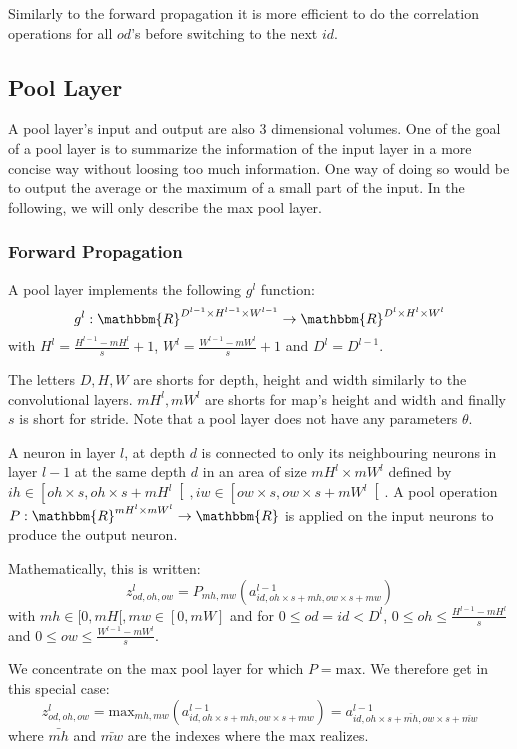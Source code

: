 \documentclass{article} %
\begin{document}
Similarly to the forward propagation it is more efficient to do the correlation operations for all $od$'s before switching to the next $id$.

\subsection{Pool Layer}
A pool layer's input and output are also 3 dimensional volumes. One of the goal of a pool layer is to summarize the information of the input layer in a more concise way without loosing too much information. One way of doing so would be to output the average or the maximum of a small part of the input. In the following, we will only describe the max pool layer.

\subsubsection{Forward Propagation}
A pool layer implements the following $g^l$ function:
$$
g^l : \mathbbm{R}^{D^{l-1}\times H^{l-1} \times W^{l-1}} \rightarrow \mathbbm{R}^{D^l \times H^l \times W^l} 
$$
with $H^{l} = \frac{H^{l-1}-mH^l}{s}+1$, $W^l = \frac{W^{l-1}-mW^l}{s}+1$ and $D^l=D^{l-1}$.

The letters $D, H, W$ are shorts for depth, height and width similarly to the convolutional layers. $mH^l, mW^l$ are shorts for map's height and width and finally $s$ is short for stride. Note that a pool layer does not have any parameters $\theta$.

A neuron in layer $l$, at depth $d$ is connected to only its neighbouring neurons in layer $l-1$ at the same depth $d$ in an area of size $mH^l\times mW^l$ defined by $ih \in \left[oh\times s, oh\times s+mH^l \right[, iw \in \left[ow\times s, ow\times s+mW^l \right[$. A pool operation $P : \mathbbm{R}^{mH^l\times mW^l} \rightarrow \mathbbm{R}$ is applied on the input neurons to produce the output neuron.

Mathematically, this is written:
$$
z^l_{od, oh, ow} 
=   P_{mh, mw}(a^{l-1}_{id, oh\times s+mh, ow\times s+mw}) 
$$
with $mh \in [0, mH[ ,mw \in [0, mW]$ and for $0 \leq od =id < D^l$, $0 \leq oh \leq \frac{H^{l-1}-mH^l}{s}$ and $0 \leq ow \leq \frac{W^{l-1}-mW^l}{s}$.

We concentrate on the max pool layer for which $P = \text{max}$. We therefore get in this special case:
$$
z^l_{od, oh, ow} 
=   \text{max}_{mh, mw}(a^{l-1}_{id, oh\times s+mh, ow\times s+mw}) = a^{l-1}_{id, oh\times s+\bar{mh}, ow\times s+\bar{mw}}
$$
where $\bar{mh}$ and $\bar{mw}$ are the indexes where the max realizes.
\end{document}

